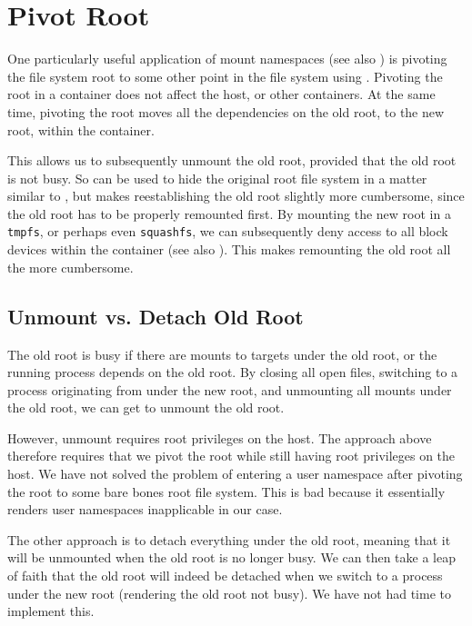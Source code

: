 
\section{Pivot Root}

One particularly useful application of mount namespaces (see also
) is pivoting the file system root to some other
point in the file system using \cite{man-2-pivot-root}. Pivoting the root in a
container does not affect the host, or other containers. At the same time,
pivoting the root moves all the dependencies on the old root, to the new root,
within the container.

This allows us to subsequently unmount the old root, provided that the old root
is not busy. So \cite{man-2-pivot-root} can be used to hide the original root
file system in a matter similar to \cite{man-2-chroot}, but makes
reestablishing the old root slightly more cumbersome, since the old root has to
be properly remounted first. By mounting the new root in a \texttt{tmpfs}, or
perhaps even \texttt{squashfs}, we can subsequently deny access to all block
devices within the container (see also
). This makes remounting the old root
all the more cumbersome.

\subsection{Unmount vs. Detach Old Root}

The old root is busy if there are mounts to targets under the old root, or the
running process depends on the old root.  By closing all open files, switching
to a process originating from under the new root, and unmounting all mounts
under the old root, we can get to unmount the old root.

However, unmount requires root privileges on the host. The approach above
therefore requires that we pivot the root while still having root privileges on
the host. We have not solved the problem of entering a user namespace after
pivoting the root to some bare bones root file system. This is bad because it
essentially renders user namespaces inapplicable in our case.

The other approach is to detach everything under the old root, meaning that it
will be unmounted when the old root is no longer busy. We can then take a leap
of faith that the old root will indeed be detached when we switch to a process
under the new root (rendering the old root not busy). We have not had time to
implement this.
